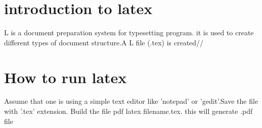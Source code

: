 \documentclass[a5paper,50pt]{article}
\begin{document}
\section {introduction to latex}
L is a document preparation system for typesetting program. it is used to create different types of document structure.A L file (.tex) is created//

\section {How to run latex}
Assume that one is using a simple text editor like 'notepad' or 'gedit'.Save the file with '.tex' extension. Build the file pdf latex filename.tex. this will generate .pdf file\\ 
 
\end{document}
